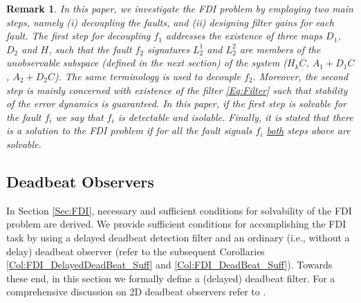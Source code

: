 \documentclass[journal,12pt,draftcls,onecolumn]{IEEEtran}
\newtheorem{remark}{Remark}
\begin{document}
\begin{remark}\label{Rem:ProbName}
	In this paper, we investigate the FDI problem by employing two main steps, namely (i) decoupling the faults, and (ii) designing  filter gains for each fault. The first step for decoupling $f_1$  addresses  the existence of three maps $D_1$, $D_2$ and $H$, such that the fault $f_2$ signatures $L_2^1$ and $L_2^2$  are members of the unobservable subspace (defined in the next section) of the system ($H_kC$, $A_1+D_1C$, $A_2+D_2C$). The same terminology is used to decouple $f_2$. Moreover, the second step is mainly concerned with existence of the filter \eqref{Eq:Filter} such that stability of the error dynamics is guaranteed. In this paper, if the first step is solvable for the fault $f_i$ we say that $f_i$ is detectable and isolable.  Finally, it is stated that there is a solution to the FDI problem if for all the fault signals $f_i$  \underline{both} steps above are solvable.
\end{remark}

\subsection{Deadbeat Observers}\label{Sec:DeabeatObs}
In Section \ref{Sec:FDI},  necessary and sufficient conditions for solvability of the FDI problem are derived. We provide  sufficient conditions for accomplishing the FDI task by using a delayed deadbeat detection filter and an ordinary (i.e., without a delay) deadbeat observer (refer to the subsequent Corollaries \ref{Col:FDI_DelayedDeadBeat_Suff} and \ref{Col:FDI_DeadBeat_Suff}). Towards these end, in this section we formally define a (delayed) deadbeat filter. For a comprehensive discussion on 2D deadbeat observers refer to \cite{Bisiacco_Obs,BisiaccoLetter}.
\end{document}

